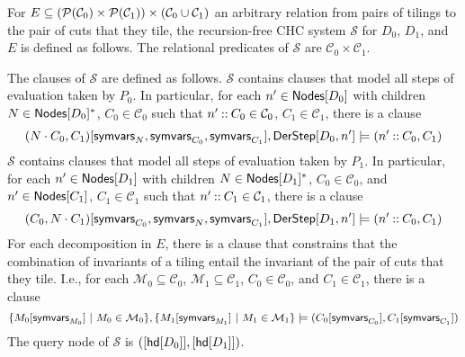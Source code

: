 For $E \subseteq (\mathcal{P}(\mathcal{C}_0) \times \mathcal{P}(\mathcal{C}_1))
\times (\mathcal{C}_0 \cup \mathcal{C}_1)$ an arbitrary relation
from pairs of tilings to the pair of cuts that they tile, the
recursion-free CHC system $\mathcal{S}$ for $D_0$, $D_1$, and $E$ is
defined as follows.
%
The relational predicates of $\mathcal{S}$ are $\mathcal{C}_0 \times
\mathcal{C}_1$.

The clauses of $\mathcal{S}$ are defined as follows.
%
$\mathcal{S}$ contains clauses that model all steps of evaluation
taken by $P_0$.
%
In particular, for each $n' \in \mathsf{Nodes}[ D_0 ]$ with children $N \in
\mathsf{Nodes}[ D_0 ]^{*}$, %
$C_0 \in \mathcal{C}_0$ such that $n' \mathbin{::} C_0 \in \mathcal{C}_0$,
$C_1 \in \mathcal{C}_1$, there is a clause %
\[ (N \concat C_0, C_1)[ \symvars{N}, \symvars{C_0}, \symvars{C_1} ], %
\derstep{D_0}{ n' } \entails %
(n' \cons C_0, C_1) \]
%
%
$\mathcal{S}$ contains clauses that model all steps of evaluation
taken by $P_1$.
%
In particular, for each $n' \in \mathsf{Nodes}[ D_1 ]$ with children $N \in
\mathsf{Nodes}[ D_1 ]^{*}$, %
$C_0 \in \mathcal{C}_0$, and %
$n' \in \mathsf{Nodes}[ C_1 ]$, %
$C_1 \in \mathcal{C}_1$ such that $n' \mathbin{::} C_1 \in \mathcal{C}_1$, %
there is a clause %
\[ (C_0, N \concat C_1)[ \symvars{C_0}, \symvars{N}, \symvars{C_1} ], %
\derstep{D_1}{ n' } \entails %
(n' \cons C_0, C_1) \]
%
For each decomposition in $E$, there is a clause that constrains that
the combination of invariants of a tiling entail the invariant of the
pair of cuts that they tile.
%
I.e., for each $\mathcal{M}_0 \subseteq \mathcal{C}_0$, %
$\mathcal{M}_1 \subseteq \mathcal{C}_1$, %
$C_0 \in \mathcal{C}_0$, and %
$C_1 \in \mathcal{C}_1$, there is a clause
%
\[ \setformer{ M_0[ \symvars{ M_0 } ]}{ M_0 \in \mathcal{M}_0 }, %
\setformer{ M_1[ \symvars{ M_1 } ] }{ M_1 \in \mathcal{M}_1 } \entails %
(C_0[ \symvars{C_0} ], C_1[ \symvars{C_1} ])
\]
%
The query node of $\mathcal{S}$ is $( [ \mathsf{hd}[ D_0 ] ], [ \mathsf{hd}[ D_1 ]
])$.

